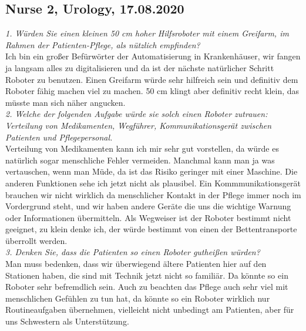 \documentclass[plainarticle,zihtitle,english,final,hyperref,utf8]{zihpub}
\begin{document}
\begin{appendices}
\subsection{Nurse 2, Urology, 17.08.2020}
\textit{1. Würden Sie einen kleinen 50 cm hoher Hilfsroboter mit einem Greifarm, im Rahmen der Patienten-Pflege, als nützlich empfinden?}\\
\newline
Ich bin ein großer Befürwörter der Automatisierung in Krankenhäuser, wir fangen ja langsam alles zu digitalisieren und da ist der nächste natürlicher Schritt Roboter zu benutzen. Einen Greifarm würde sehr hilfreich sein und definitiv dem Roboter fähig machen viel zu machen. 50 cm klingt aber definitiv recht klein, das müsste man sich näher angucken.\\
\newline
\textit{2. Welche der folgenden Aufgabe würde sie solch einen Roboter zutrauen: Verteilung von Medikamenten, Wegführer, Kommunikationsgerät zwischen Patienten und Pflegepersonal.}\\
\newline
Verteilung von Medikamenten kann ich mir sehr gut vorstellen, da würde es natürlich sogar menschliche Fehler vermeiden. Manchmal kann man ja was vertauschen, wenn man Müde, da ist das Risiko geringer mit einer Maschine. Die anderen Funktionen sehe ich jetzt nicht als plausibel. Ein Kommmunikationsgerät brauchen wir nicht wirklich da menschlicher Kontakt in der Pflege immer noch im Vordergrund steht, und wir haben andere Geräte die uns die wichtige Warnung oder Informationen übermitteln. Als Wegweiser ist der Roboter bestimmt nicht geeignet, zu klein denke ich, der würde bestimmt von einen der Bettentransporte überrollt werden. \\
\newline
\textit{3. Denken Sie, dass die Patienten so einen Roboter gutheißen würden?}\\
\newline
Man muss bedenken, dass wir überwiegend ältere Patienten hier auf den Stationen haben, die sind mit Technik jetzt nicht so familiär. Da könnte so ein Roboter sehr befremdlich sein. Auch zu beachten das Pflege auch sehr viel mit menschlichen Gefühlen zu tun hat, da könnte so ein Roboter wirklich nur Routineaufgaben übernehmen, vielleicht nicht unbedingt am Patienten, aber für uns Schwestern als Unterstützung. 

\end{appendices}
\end{document}

